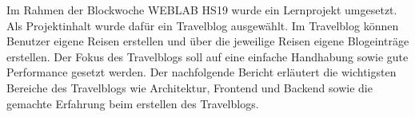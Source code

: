 \documentclass[../main.tex]{subfiles}
\begin{document}
Im Rahmen der Blockwoche WEBLAB HS19 wurde ein Lernprojekt umgesetzt. Als Projektinhalt wurde dafür ein Travelblog ausgewählt. Im Travelblog können Benutzer eigene Reisen erstellen und über die jeweilige Reisen eigene Blogeinträge erstellen. Der Fokus des Travelblogs soll auf eine einfache Handhabung sowie gute Performance gesetzt werden. Der nachfolgende Bericht erläutert die wichtigsten Bereiche des Travelblogs wie Architektur, Frontend und Backend sowie die gemachte Erfahrung beim erstellen des Travelblogs.
\end{document}
